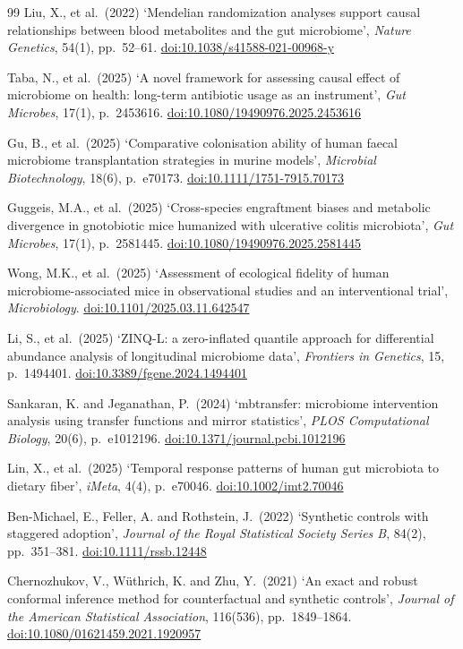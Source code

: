 \documentclass[11pt]{article}
\newcommand{\doi}[1]{\href{https://doi.org/#1}{doi:#1}}
\begin{document}
\begin{thebibliography}{99}
Liu, X., et al.\ (2022) `Mendelian randomization analyses support causal relationships between blood
metabolites and the gut microbiome', \textit{Nature Genetics}, 54(1), pp.\ 52--61.
\doi{10.1038/s41588-021-00968-y}


Taba, N., et al.\ (2025) `A novel framework for assessing causal effect of microbiome on health: long-term antibiotic usage as an instrument', \textit{Gut Microbes}, 17(1), p.\ 2453616. \doi{10.1080/19490976.2025.2453616}


Gu, B., et al.\ (2025) `Comparative colonisation ability of human faecal microbiome transplantation
strategies in murine models', \textit{Microbial Biotechnology}, 18(6), p.\ e70173.
\doi{10.1111/1751-7915.70173}


Guggeis, M.A., et al.\ (2025) `Cross-species engraftment biases and metabolic divergence in
gnotobiotic mice humanized with ulcerative colitis microbiota', \textit{Gut Microbes}, 17(1),
p.\ 2581445. \doi{10.1080/19490976.2025.2581445}


Wong, M.K., et al.\ (2025) `Assessment of ecological fidelity of human microbiome-associated mice in
observational studies and an interventional trial', \textit{Microbiology}.
\doi{10.1101/2025.03.11.642547}


Li, S., et al.\ (2025) `ZINQ-L: a zero-inflated quantile approach for differential abundance analysis
of longitudinal microbiome data', \textit{Frontiers in Genetics}, 15, p.\ 1494401.
\doi{10.3389/fgene.2024.1494401}


Sankaran, K. and Jeganathan, P.\ (2024) `mbtransfer: microbiome intervention analysis using transfer functions and mirror statistics', \textit{PLOS Computational Biology}, 20(6), p.\ e1012196. \doi{10.1371/journal.pcbi.1012196}


Lin, X., et al.\ (2025) `Temporal response patterns of human gut microbiota to dietary fiber', \textit{iMeta}, 4(4), p.\ e70046. \doi{10.1002/imt2.70046}


Ben-Michael, E., Feller, A. and Rothstein, J.\ (2022) `Synthetic controls with staggered adoption',
\textit{Journal of the Royal Statistical Society Series B}, 84(2), pp.\ 351--381.
\doi{10.1111/rssb.12448}


Chernozhukov, V., W\"uthrich, K. and Zhu, Y.\ (2021) `An exact and robust conformal inference method
for counterfactual and synthetic controls', \textit{Journal of the American Statistical Association},
116(536), pp.\ 1849--1864. \doi{10.1080/01621459.2021.1920957}



\end{thebibliography}
\end{document}

